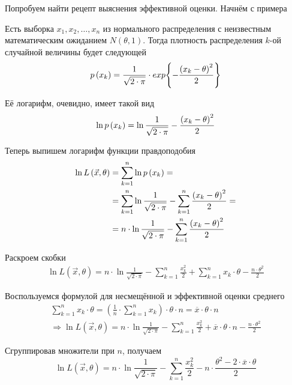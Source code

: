 Попробуем найти рецепт выяснения эффективной оценки. Начнём с примера
\begin{example}
    Есть выборка $x_1, x_2, \dots, x_n$ из нормального распределения
    с неизвестным математическим ожиданием $N\left( \theta,1 \right)$.
    Тогда плотность распределения $k$-ой случайной величины будет следующей
    $$p\left(x_k\right)
        =\frac{1}{\sqrt{2\cdot\pi}}
            \cdot exp{\left\{-\frac{\left(x_k-\theta\right)^2}{2}\right\}}$$

    Её логарифм, очевидно, имеет такой вид
    $$\ln{p\left(x_k\right)}
        =\ln{\frac{1}{\sqrt{2\cdot\pi}}}
            -\frac{\left(x_k-\theta\right)^2}{2}$$

    Теперь выпишем логарифм функции правдоподобия
    \begin{align*}
        \ln{L\left( \vec{x},\theta \right)}
        &=\sum_{k=1}^n \ln{p\left(x_k\right)}=\\
        &=\sum_{k=1}^n \ln{\frac{1}{\sqrt{2\cdot\pi}}}
            -\sum_{k=1}^n \frac{\left(x_k-\theta\right)^2}{2}=\\
        &=n\cdot\ln{\frac{1}{\sqrt{2\cdot\pi}}}
            -\sum_{k=1}^n \frac{\left(x_k-\theta\right)^2}{2}
    \end{align*}

    Раскроем скобки
    \begin{align*}
        \ln{L\left( \vec{x},\theta \right)}
        =n\cdot\ln{\frac{1}{\sqrt{2\cdot\pi}}}
            -\sum_{k=1}^n \frac{x_k^2}{2}
            +\sum_{k=1}^n x_k\cdot\theta
            -\frac{n\cdot\theta^2}{2}
    \end{align*}

    Воспользуемся формулой для несмещённой и эффективной оценки среднего
    \begin{align*}
        \sum_{k=1}^n x_k\cdot\theta
            =\left( \frac{1}{n}\cdot\sum_{k=1}^n x_k \right) \cdot\theta\cdot n
            =\overline{x}\cdot\theta\cdot n\\
        \Rightarrow\ln{L\left( \vec{x},\theta \right)}
        =n\cdot\ln{\frac{1}{\sqrt{2\cdot\pi}}}
            -\sum_{k=1}^n \frac{x_k^2}{2}
            +\overline{x}\cdot\theta\cdot n
            -\frac{n\cdot\theta^2}{2}
    \end{align*}

    Сгруппировав множители при $n$, получаем
    $$\ln{L\left( \vec{x},\theta \right)}
        =n\cdot\ln{\frac{1}{\sqrt{2\cdot\pi}}}
            -\sum_{k=1}^n \frac{x_k^2}{2}
            -n\cdot\frac{\theta^2
                -2\cdot\overline{x}\cdot\theta}{2}$$


\end{example}

